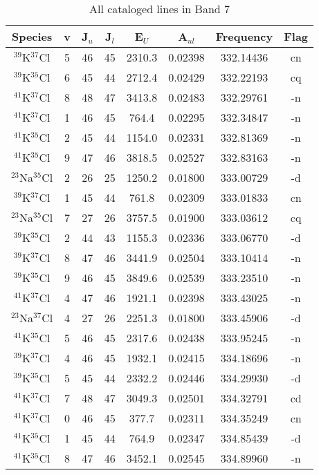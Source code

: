 \begin{table*}[htp]
\centering
\caption{All cataloged lines in Band 7}
\begin{tabular}{cccccccc}
\label{tab:all_detections_B7}
Species & v & J$_u$ & J$_l$ & E$_U$ & A$_{ul}$ & Frequency & Flag \\
\hline
$^{39}$K$^{37}$Cl & 5 & 46 & 45 & 2310.3 & 0.02398 & 332.14436 & cn \\
$^{39}$K$^{35}$Cl & 6 & 45 & 44 & 2712.4 & 0.02429 & 332.22193 & cq \\
$^{41}$K$^{37}$Cl & 8 & 48 & 47 & 3413.8 & 0.02483 & 332.29761 & -n \\
$^{41}$K$^{37}$Cl & 1 & 46 & 45 & 764.4 & 0.02295 & 332.34847 & -n \\
$^{41}$K$^{35}$Cl & 2 & 45 & 44 & 1154.0 & 0.02331 & 332.81369 & -n \\
$^{41}$K$^{35}$Cl & 9 & 47 & 46 & 3818.5 & 0.02527 & 332.83163 & -n \\
$^{23}$Na$^{35}$Cl & 2 & 26 & 25 & 1250.2 & 0.01800 & 333.00729 & -d \\
$^{39}$K$^{37}$Cl & 1 & 45 & 44 & 761.8 & 0.02309 & 333.01833 & cn \\
$^{23}$Na$^{35}$Cl & 7 & 27 & 26 & 3757.5 & 0.01900 & 333.03612 & cq \\
$^{39}$K$^{35}$Cl & 2 & 44 & 43 & 1155.3 & 0.02336 & 333.06770 & -d \\
$^{39}$K$^{37}$Cl & 8 & 47 & 46 & 3441.9 & 0.02504 & 333.10414 & -n \\
$^{39}$K$^{35}$Cl & 9 & 46 & 45 & 3849.6 & 0.02539 & 333.23510 & -n \\
$^{41}$K$^{37}$Cl & 4 & 47 & 46 & 1921.1 & 0.02398 & 333.43025 & -n \\
$^{23}$Na$^{37}$Cl & 4 & 27 & 26 & 2251.3 & 0.01800 & 333.45906 & -d \\
$^{41}$K$^{35}$Cl & 5 & 46 & 45 & 2317.6 & 0.02438 & 333.95245 & -n \\
$^{39}$K$^{37}$Cl & 4 & 46 & 45 & 1932.1 & 0.02415 & 334.18696 & -n \\
$^{39}$K$^{35}$Cl & 5 & 45 & 44 & 2332.2 & 0.02446 & 334.29930 & -d \\
$^{41}$K$^{37}$Cl & 7 & 48 & 47 & 3049.3 & 0.02501 & 334.32791 & cd \\
$^{41}$K$^{37}$Cl & 0 & 46 & 45 & 377.7 & 0.02311 & 334.35249 & cn \\
$^{41}$K$^{35}$Cl & 1 & 45 & 44 & 764.9 & 0.02347 & 334.85439 & -d \\
$^{41}$K$^{35}$Cl & 8 & 47 & 46 & 3452.1 & 0.02545 & 334.89960 & -n \\

\end{tabular}
\end{table*}
